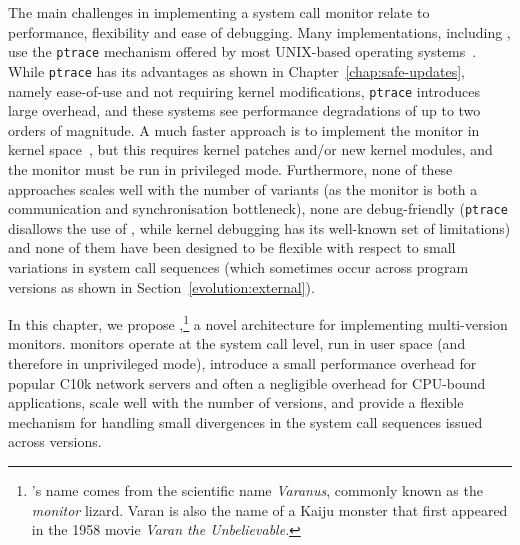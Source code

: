 
The main challenges in implementing a system call monitor relate to
performance, flexibility and ease of debugging.  Many implementations,
including \mx, use the \lstinline`ptrace` mechanism offered by most UNIX-based
operating systems~\cite{orchestra09,mx,process-replicae07}.  While
\lstinline`ptrace` has its advantages as shown in
Chapter~\ref{chap:safe-updates}, namely ease-of-use and not requiring kernel
modifications, \lstinline`ptrace` introduces large overhead, and these systems
see performance degradations of up to two orders of magnitude.  A much faster
approach is to implement the monitor in kernel space~\cite{cox2006}, but this
requires kernel patches and/or new kernel modules, and the monitor must be run
in privileged mode.  Furthermore, none of these approaches scales well with the
number of variants (as the monitor is both a communication and synchronisation
bottleneck), none are debug-friendly (\lstinline`ptrace` disallows the use of
\gdb, while kernel debugging has its well-known set of limitations) and none of
them have been designed to be flexible with respect to small variations in
system call sequences (which sometimes occur across program versions as shown
in Section~\ref{evolution:external}).

In this chapter, we propose \varan,\footnote{\varan's name comes from
  the scientific name \emph{Varanus}, commonly known as the
  \emph{monitor} lizard. Varan is also the name of a Kaiju monster
  that first appeared in the 1958 movie \emph{Varan the
    Unbelievable}.} a novel architecture for implementing multi-version
monitors.  \varan monitors operate at the system call level, run in
user space (and therefore in unprivileged mode), introduce a small
performance overhead for popular C10k network servers and often a
negligible overhead for CPU-bound applications, scale well with the
number of versions, and provide a flexible mechanism for handling small
divergences in the system call sequences issued across versions.







